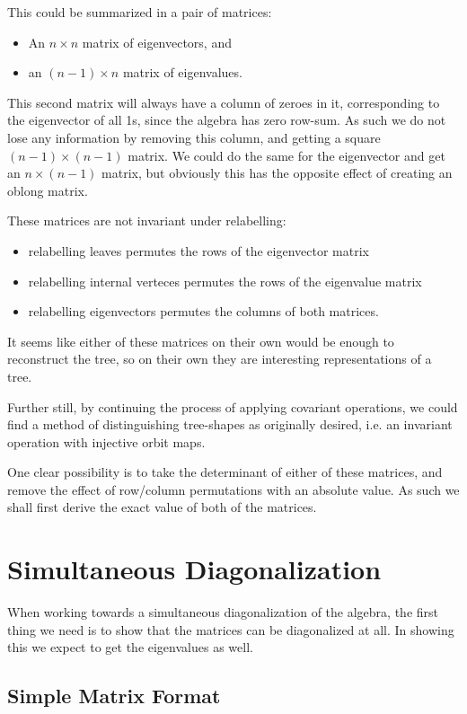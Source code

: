 \documentclass[10pt,a4paper]{report}
\begin{document}
This could be summarized in a pair of matrices:
\begin{itemize}
	\item An $n \times n$ matrix of eigenvectors, and
	\item an $(n-1) \times n$ matrix of eigenvalues.
\end{itemize}

This second matrix will always have a column of zeroes in it, corresponding to
the eigenvector of all 1s, since the algebra has zero row-sum.
As such we do not lose any information by removing this column, and getting a
square $(n-1) \times (n-1)$ matrix.
We could do the same for the eigenvector and get an $n \times (n-1)$ matrix,
but obviously this has the opposite effect of creating an oblong matrix.

These matrices are not invariant under relabelling:
\begin{itemize}
	\item relabelling leaves permutes the rows of the eigenvector matrix
	\item relabelling internal verteces permutes the rows of the eigenvalue matrix
	\item relabelling eigenvectors permutes the columns of both matrices.
\end{itemize}

It seems like either of these matrices on their own would be enough to
reconstruct the tree, so on their own they are interesting representations of a tree.

Further still, by continuing the process of applying covariant operations, we could find a method of distinguishing tree-shapes as originally desired, i.e. an invariant operation with injective orbit maps.

One clear possibility is to take the determinant of either of these matrices,
and remove the effect of row/column permutations with an absolute value.
As such we shall first derive the exact value of both of the matrices.

\chapter{Simultaneous Diagonalization}

When working towards a simultaneous diagonalization of the algebra, the first
thing we need is to show that the matrices can be diagonalized at all.
In showing this we expect to get the eigenvalues as well.


\section{Simple Matrix Format}
\end{document}
